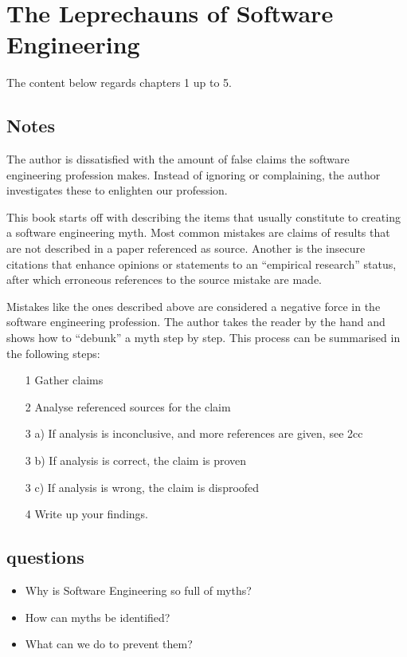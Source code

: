 \chapter{The Leprechauns of Software Engineering \cite{leprechaun}}
The content below regards chapters 1 up to 5.
\section{Notes}
The author is dissatisfied with the amount of false claims the software engineering profession makes.
Instead of ignoring or complaining, the author investigates these to enlighten our profession.

This book starts off with describing the items that usually constitute to creating a software engineering myth. 
Most common mistakes are claims of results that are not described in a paper referenced as source. 
Another is the insecure citations that enhance opinions or statements to an ``empirical research'' status, after which erroneous references to the source mistake are made.

Mistakes like the ones described above are considered a negative force in the software engineering profession. 
The author takes the reader by the hand and shows how to ``debunk'' a myth step by step. 
This process can be summarised in the following steps:
\begin{itemize}
  \item[1] Gather claims
  \item[2] Analyse referenced sources for the claim
  \item[3] a) If analysis is inconclusive, and more references are given, see 2cc
  \item[3] b) If analysis is correct, the claim is proven
  \item[3] c) If analysis is wrong, the claim is disproofed
  \item[4] Write up your findings.
\end{itemize}


\section{questions}
\begin{itemize}
  \item Why is Software Engineering so full of myths?
  \item How can myths be identified?
  \item What can we do to prevent them?
\end{itemize}
